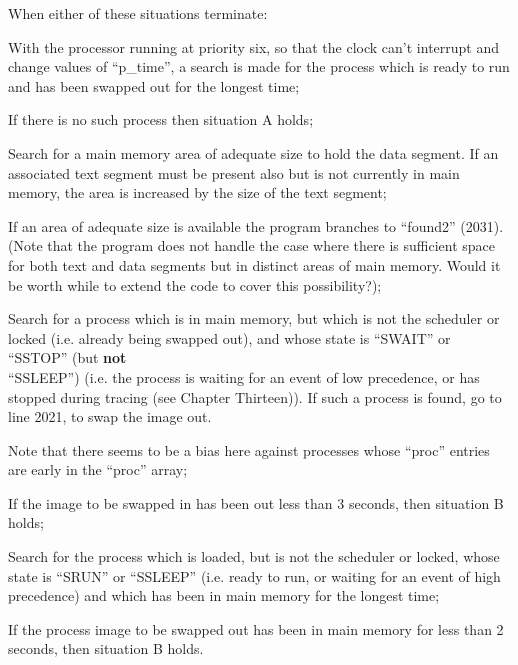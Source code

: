 \noindent When either of these situations terminate:

\bd
\item[1958:] With the processor running at
 priority six, so that the clock
 can't interrupt and change values
 of ``p\_time'', a search is made for
 the process which is ready to run
 and has been swapped out for the
 longest time;

\item[1966:] If there is no such process then
situation A holds;

\item[1976:] Search for a main memory area of
 adequate size to hold the data
 segment. If an associated text
 segment must be present also but
 is not currently in main memory,
 the area is increased by the size
 of the text segment;

\item[1982:] If an area of adequate size is
 available the program branches to
 ``found2'' (2031). (Note that the
 program does not handle the case
 where there is sufficient space
 for both text and data segments
 but in distinct areas of main
 memory. Would it be worth while
 to extend the code to cover this
 possibility?);

\item[1990:] Search for a process which is in
 main memory, but which is not the
 scheduler or locked (i.e. already
 being swapped out), and whose
 state is ``SWAIT'' or ``SSTOP'' (but
 {\bf not}\\
``SSLEEP'') (i.e. the process
 is waiting for an event of low
 precedence, or has stopped during
 tracing (see Chapter Thirteen)).
 If such a process is found, go to
 line 2021, to swap the image out.

Note that there seems to be a
bias here against processes whose
``proc'' entries are early in the
``proc'' array;

\item[2003:] If the image to be swapped in has
 been out less than 3 seconds,
 then situation B holds;

\item[2005:] Search for the process which is
 loaded, but is not the scheduler
 or locked, whose state is ``SRUN''
 or ``SSLEEP'' (i.e. ready to run,
 or waiting for an event of high
 precedence) and which has been in
 main memory for the longest time;

\item[2013:] If the process image to be
 swapped out has been in main
 memory for less than 2 seconds,
 then situation B holds.

